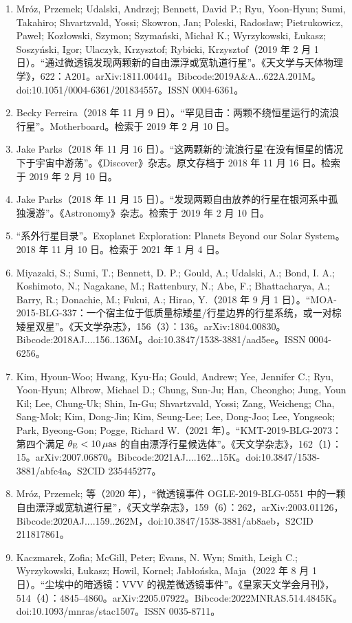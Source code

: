 \begin{enumerate}
\item Mróz, Przemek; Udalski, Andrzej; Bennett, David P.; Ryu, Yoon-Hyun; Sumi, Takahiro; Shvartzvald, Yossi; Skowron, Jan; Poleski, Radosław; Pietrukowicz, Paweł; Kozłowski, Szymon; Szymański, Michał K.; Wyrzykowski, Łukasz; Soszyński, Igor; Ulaczyk, Krzysztof; Rybicki, Krzysztof（2019 年 2 月 1 日）。“通过微透镜发现两颗新的自由漂浮或宽轨道行星”。《天文学与天体物理学》，622：A201。arXiv:1811.00441。Bibcode:2019A\&A...622A.201M。doi:10.1051/0004-6361/201834557。ISSN 0004-6361。  
\item Becky Ferreira（2018 年 11 月 9 日）。“罕见目击：两颗不绕恒星运行的流浪行星”。Motherboard。检索于 2019 年 2 月 10 日。  
\item Jake Parks（2018 年 11 月 16 日）。“这两颗新的‘流浪行星’在没有恒星的情况下于宇宙中游荡”。《Discover》杂志。原文存档于 2018 年 11 月 16 日。检索于 2019 年 2 月 10 日。  
\item Jake Parks（2018 年 11 月 15 日）。“发现两颗自由放养的行星在银河系中孤独漫游”。《Astronomy》杂志。检索于 2019 年 2 月 10 日。  
\item “系外行星目录”。Exoplanet Exploration: Planets Beyond our Solar System。2018 年 11 月 10 日。检索于 2021 年 1 月 4 日。  
\item Miyazaki, S.; Sumi, T.; Bennett, D. P.; Gould, A.; Udalski, A.; Bond, I. A.; Koshimoto, N.; Nagakane, M.; Rattenbury, N.; Abe, F.; Bhattacharya, A.; Barry, R.; Donachie, M.; Fukui, A.; Hirao, Y.（2018 年 9 月 1 日）。“MOA-2015-BLG-337：一个宿主位于低质量棕矮星/行星边界的行星系统，或一对棕矮星双星”。《天文学杂志》，156（3）：136。arXiv:1804.00830。Bibcode:2018AJ....156..136M。doi:10.3847/1538-3881/aad5ee。ISSN 0004-6256。  
\item Kim, Hyoun-Woo; Hwang, Kyu-Ha; Gould, Andrew; Yee, Jennifer C.; Ryu, Yoon-Hyun; Albrow, Michael D.; Chung, Sun-Ju; Han, Cheongho; Jung, Youn Kil; Lee, Chung-Uk; Shin, In-Gu; Shvartzvald, Yossi; Zang, Weicheng; Cha, Sang-Mok; Kim, Dong-Jin; Kim, Seung-Lee; Lee, Dong-Joo; Lee, Yongseok; Park, Byeong-Gon; Pogge, Richard W.（2021 年）。“KMT-2019-BLG-2073：第四个满足 $\theta_{\rm E}<10\,\mu\mathrm{as}$ 的自由漂浮行星候选体”。《天文学杂志》，162（1）：15。arXiv:2007.06870。Bibcode:2021AJ....162...15K。doi:10.3847/1538-3881/abfc4a。S2CID 235445277。  
\item Mróz, Przemek; 等（2020 年），“微透镜事件 OGLE-2019-BLG-0551 中的一颗自由漂浮或宽轨道行星”，《天文学杂志》，159（6）：262，arXiv:2003.01126，Bibcode:2020AJ....159..262M，doi:10.3847/1538-3881/ab8aeb，S2CID 211817861。  
\item Kaczmarek, Zofia; McGill, Peter; Evans, N. Wyn; Smith, Leigh C.; Wyrzykowski, Łukasz; Howil, Kornel; Jabłońska, Maja（2022 年 8 月 1 日）。“尘埃中的暗透镜：VVV 的视差微透镜事件”。《皇家天文学会月刊》，514（4）：4845--4860。arXiv:2205.07922。Bibcode:2022MNRAS.514.4845K。doi:10.1093/mnras/stac1507。ISSN 0035-8711。 

\end{enumerate}
